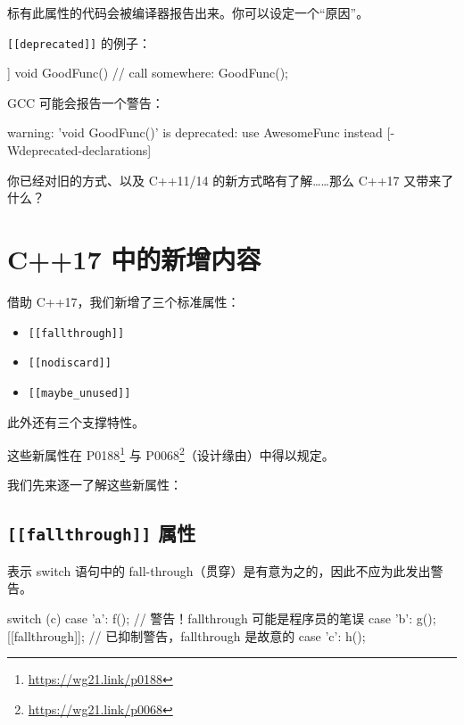 标有此属性的代码会被编译器报告出来。你可以设定一个“原因”。

\texttt{\texttt{\texttt{[[deprecated]]}}} 的例子：

\begin{codebox}[cpp]
[[deprecated("use AwesomeFunc instead")]] void GoodFunc() { }
// call somewhere:
GoodFunc();
\end{codebox}

GCC 可能会报告一个警告：

\begin{codebox}
warning: 'void GoodFunc()' is deprecated: use AwesomeFunc instead
[-Wdeprecated-declarations]
\end{codebox}

你已经对旧的方式、以及 C++11/14 的新方式略有了解……那么 C++17 又带来了什么？

\section{C++17 中的新增内容}

借助 C++17，我们新增了三个标准属性：

\begin{itemize}
\item \texttt{\texttt{[[fallthrough]]}}
\item \texttt{\texttt{[[nodiscard]]}}
\item \texttt{\texttt{[[maybe\_unused]]}}
\end{itemize}

此外还有三个支撑特性。

\begin{myInfoBox}
这些新属性在 P0188\footnote{\url{https://wg21.link/p0188}} 与 P0068\footnote{\url{https://wg21.link/p0068}}（设计缘由）中得以规定。
\end{myInfoBox}

我们先来逐一了解这些新属性：

\subsection{\texttt{\texttt{[[fallthrough]]}} 属性}

表示 switch 语句中的 fall-through（贯穿）是有意为之的，因此不应为此发出警告。

\begin{codebox}[cpp]
switch (c) {
case 'a':
f(); // 警告！fallthrough 可能是程序员的笔误
case 'b':
g();
[[fallthrough]]; // 已抑制警告，fallthrough 是故意的
case 'c':
h();
}
\end{codebox}


